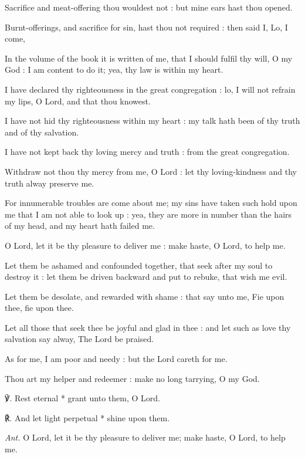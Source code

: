 Sacrifice and meat-offering thou wouldest not : but mine ears hast thou opened.\par
{}Burnt-offerings, and sacrifice for sin, hast thou not required : then said I, Lo, I come,\par
{}In the volume of the book it is written of me, that I should fulfil thy will, O my God : I am content to do it; yea, thy law is within my heart.\par
{}I have declared thy righteousness in the great congregation : lo, I will not refrain my lips, O Lord, and that thou knowest.\par
{}I have not hid thy righteousness within my heart : my talk hath been of thy truth and of thy salvation.\par
{}I have not kept back thy loving mercy and truth : from the great congregation.\par
{}Withdraw not thou thy mercy from me, O Lord : let thy loving-kindness and thy truth alway preserve me.\par
{}For innumerable troubles are come about me; my sins have taken such hold upon me that I am not able to look up : yea, they are more in number than the hairs of my head, and my heart hath failed me.\par
{}O Lord, let it be thy pleasure to deliver me : make haste, O Lord, to help me.\par
{}Let them be ashamed and confounded together, that seek after my soul to destroy it : let them be driven backward and put to rebuke, that wish me evil.\par
{}Let them be desolate, and rewarded with shame : that say unto me, Fie upon thee, fie upon thee.\par
{}Let all those that seek thee be joyful and glad in thee : and let such as love thy salvation say alway, The Lord be praised.\par
{}As for me, I am poor and needy : but the Lord careth for me.\par
{}Thou art my helper and redeemer : make no long tarrying, O my God.\par
℣. Rest eternal * grant unto them, O Lord.\par
℟. And let light perpetual * shine upon them.\par\noindent
\textit{Ant.} O Lord, let it be thy pleasure to deliver me; make haste, O Lord, to help me.\par
{}\par\noindent
